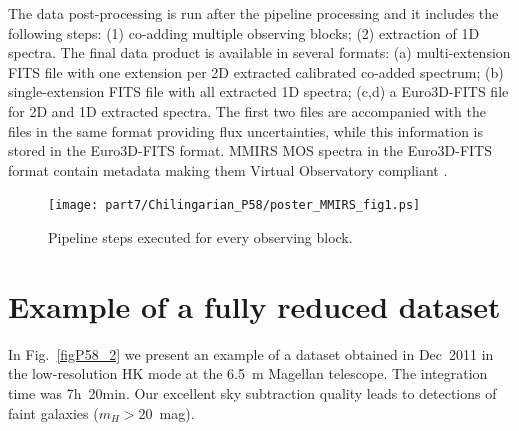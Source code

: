 The data post-processing is run after the pipeline processing and it
includes the following steps: (1) co-adding multiple observing blocks; (2)
extraction of 1D spectra.  The final data product is available in several
formats: (a) multi-extension FITS file with one extension per 2D extracted
calibrated co-added spectrum; (b) single-extension FITS file with all
extracted 1D spectra; (c,d) a Euro3D-FITS file for 2D and 1D extracted
spectra.  The first two files are accompanied with the files in the same
format providing flux uncertainties, while this information is stored in the
Euro3D-FITS format.  MMIRS MOS spectra in the Euro3D-FITS format contain
metadata making them Virtual Observatory compliant
\citep{CBLM06,Chilingarian+08b}.

\begin{figure}
\texttt{[image: part7/Chilingarian\_P58/poster\_MMIRS\_fig1.ps]}
\caption{Pipeline steps executed for every observing block.\label{figP58_1}}
\end{figure}

\section{Example of a fully reduced dataset}

In Fig.~\ref{figP58_2} we present an example of a dataset obtained in
Dec~2011 in the low-resolution HK mode at the 6.5~m Magellan telescope. The
integration time was 7h~20min. Our excellent sky subtraction quality
leads to detections of faint galaxies ($m_H>20$~mag).



